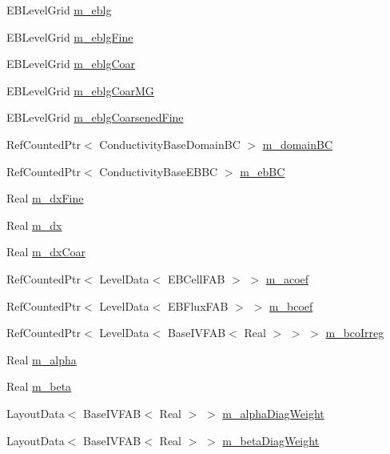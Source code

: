\begin{DoxyCompactItemize}
E\+B\+Level\+Grid \hyperlink{classebconductivityop_ad1cd04d880045c43c93028e3139fea90}{m\+\_\+eblg}
\item 
E\+B\+Level\+Grid \hyperlink{classebconductivityop_ac8fb94db539cc265a5851d3178979484}{m\+\_\+eblg\+Fine}
\item 
E\+B\+Level\+Grid \hyperlink{classebconductivityop_a889c0e41afa7f3802d726ff46a3d22aa}{m\+\_\+eblg\+Coar}
\item 
E\+B\+Level\+Grid \hyperlink{classebconductivityop_a8fb944d5a01d3d3cb3ea7e58cb460219}{m\+\_\+eblg\+Coar\+MG}
\item 
E\+B\+Level\+Grid \hyperlink{classebconductivityop_a812449748a34dd673848fffc4f86041f}{m\+\_\+eblg\+Coarsened\+Fine}
\item 
Ref\+Counted\+Ptr$<$ Conductivity\+Base\+Domain\+BC $>$ \hyperlink{classebconductivityop_a421aabc47547b41d3261de13ac5d5663}{m\+\_\+domain\+BC}
\item 
Ref\+Counted\+Ptr$<$ Conductivity\+Base\+E\+B\+BC $>$ \hyperlink{classebconductivityop_a3779a8f0f407ad7539898f3ab3d38db3}{m\+\_\+eb\+BC}
\item 
Real \hyperlink{classebconductivityop_a127419d21e5b738457f9ea0cc847890e}{m\+\_\+dx\+Fine}
\item 
Real \hyperlink{classebconductivityop_a1a550b6a31545943978f6c98e2006bc2}{m\+\_\+dx}
\item 
Real \hyperlink{classebconductivityop_a454a4fd4452e8b15921d6a498d52d427}{m\+\_\+dx\+Coar}
\item 
Ref\+Counted\+Ptr$<$ Level\+Data$<$ E\+B\+Cell\+F\+AB $>$ $>$ \hyperlink{classebconductivityop_a4733ab5daee6c23bb5755e11621f0529}{m\+\_\+acoef}
\item 
Ref\+Counted\+Ptr$<$ Level\+Data$<$ E\+B\+Flux\+F\+AB $>$ $>$ \hyperlink{classebconductivityop_a93dc94bee7ac7e8010e5db24894463ea}{m\+\_\+bcoef}
\item 
Ref\+Counted\+Ptr$<$ Level\+Data$<$ Base\+I\+V\+F\+AB$<$ Real $>$ $>$ $>$ \hyperlink{classebconductivityop_a9165c00d7f28d242fdb5772ebb59a0d1}{m\+\_\+bco\+Irreg}
\item 
Real \hyperlink{classebconductivityop_a58cff16e5e8f875105be87e190e7b801}{m\+\_\+alpha}
\item 
Real \hyperlink{classebconductivityop_af73e640bc0b6f941bf843361a4d3c41a}{m\+\_\+beta}
\item 
Layout\+Data$<$ Base\+I\+V\+F\+AB$<$ Real $>$ $>$ \hyperlink{classebconductivityop_a16d5374437099848d72dd60597596f04}{m\+\_\+alpha\+Diag\+Weight}
\item 
Layout\+Data$<$ Base\+I\+V\+F\+AB$<$ Real $>$ $>$ \hyperlink{classebconductivityop_a44118f56509ff608e9b7461d32c22d1e}{m\+\_\+beta\+Diag\+Weight}

\end{DoxyCompactItemize}
